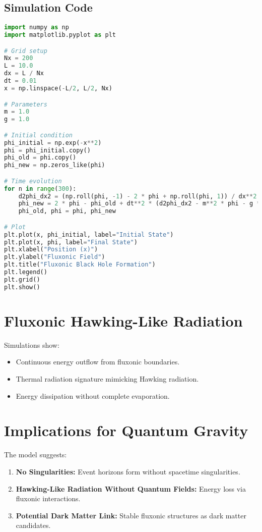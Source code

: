 \documentclass{article}
\begin{document}
\subsection{Simulation Code}
\begin{lstlisting}[language=Python, caption=Fluxonic Black Hole Simulation, label=lst:blackhole]
import numpy as np
import matplotlib.pyplot as plt

# Grid setup
Nx = 200
L = 10.0
dx = L / Nx
dt = 0.01
x = np.linspace(-L/2, L/2, Nx)

# Parameters
m = 1.0
g = 1.0

# Initial condition
phi_initial = np.exp(-x**2)
phi = phi_initial.copy()
phi_old = phi.copy()
phi_new = np.zeros_like(phi)

# Time evolution
for n in range(300):
    d2phi_dx2 = (np.roll(phi, -1) - 2 * phi + np.roll(phi, 1)) / dx**2  # Periodic boundaries
    phi_new = 2 * phi - phi_old + dt**2 * (d2phi_dx2 - m**2 * phi - g * phi**3)
    phi_old, phi = phi, phi_new

# Plot
plt.plot(x, phi_initial, label="Initial State")
plt.plot(x, phi, label="Final State")
plt.xlabel("Position (x)")
plt.ylabel("Fluxonic Field")
plt.title("Fluxonic Black Hole Formation")
plt.legend()
plt.grid()
plt.show()
\end{lstlisting}

\section{Fluxonic Hawking-Like Radiation}
Simulations show:
\begin{itemize}
    \item Continuous energy outflow from fluxonic boundaries.
    \item Thermal radiation signature mimicking Hawking radiation.
    \item Energy dissipation without complete evaporation.
\end{itemize}

\section{Implications for Quantum Gravity}
The model suggests:
\begin{enumerate}
    \item \textbf{No Singularities:} Event horizons form without spacetime singularities.
    \item \textbf{Hawking-Like Radiation Without Quantum Fields:} Energy loss via fluxonic interactions.
    \item \textbf{Potential Dark Matter Link:} Stable fluxonic structures as dark matter candidates.
\end{enumerate}
\end{document}
